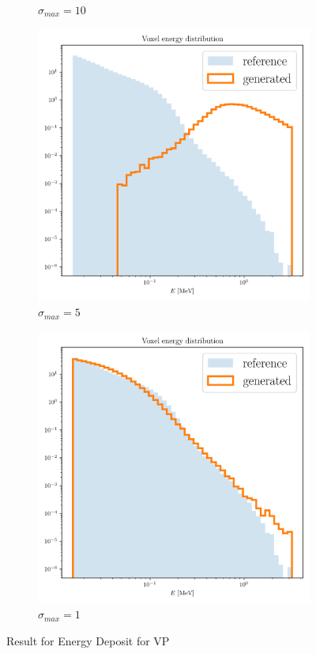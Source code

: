 \begin{figure}
\begin{subfigure}[b]{0.23\textwidth}
        \caption{$\sigma_{max}=10$}
        \label{fig:vp10_7}
    \end{subfigure}
    \hfill
    \begin{subfigure}[b]{0.23\textwidth}
        \centering
        \includegraphics[width=\textwidth]{Figures/vp5_7.png}
        \caption{$\sigma_{max}=5$}
        \label{fig:vp5_7}
    \end{subfigure}
    \hfill
    \begin{subfigure}[b]{0.23\textwidth}  %
        \centering
        \includegraphics[width=\textwidth]{Figures/vp1_7.png}
        \caption{$\sigma_{max}=1$}
        \label{fig:vp1_7}
    \end{subfigure}
    \caption{Result for Energy Deposit for VP}
\end{figure}